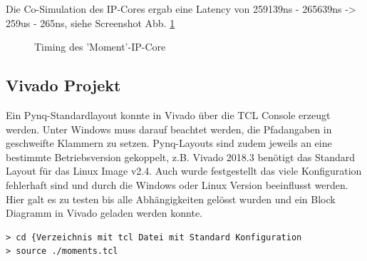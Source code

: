 \documentclass[a4paper]{report}
\begin{document}
Die Co-Simulation des IP-Cores ergab eine Latency von 259139ns - 265639ns -> 259us - 265ns, siehe Screenshot Abb. \ref{fig:timing}

\begin{figure}[H]
\centering
{}
\caption{Timing des 'Moment'-IP-Core}
\label{fig:timing}
\end{figure}

\subsection{Vivado Projekt}

Ein Pynq-Standardlayout konnte in Vivado über die TCL Console erzeugt werden. Unter Windows muss darauf beachtet werden, die Pfadangaben in geschweifte Klammern zu setzen. Pynq-Layouts sind zudem jeweils an eine bestimmte Betriebsversion gekoppelt, z.B. Vivado 2018.3 benötigt das Standard Layout für das Linux Image v2.4. Auch wurde festgestellt das viele Konfiguration fehlerhaft sind und durch die Windows oder Linux Version beeinflusst werden. Hier galt es zu testen bis alle Abhängigkeiten gelösst wurden und ein Block Diagramm in Vivado geladen werden konnte.

\begin{verbatim}
> cd {Verzeichnis mit tcl Datei mit Standard Konfiguration
> source ./moments.tcl
\end{verbatim}
\end{document}
